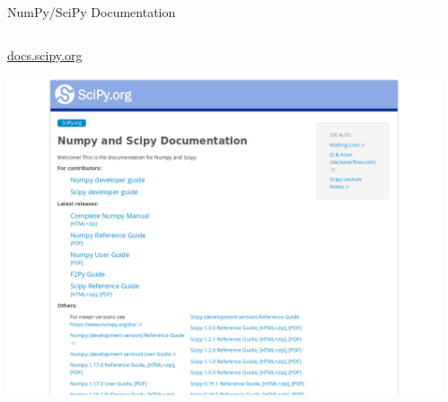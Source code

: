 \documentclass[svgnames]{beamer}
\begin{document}
\begin{frame}{NumPy/SciPy Documentation}
 \begin{columns}
  \begin{column}{0.45\textwidth}
   \url{docs.scipy.org}

   \vspace{0.5truecm}
   \hspace*{-1.0truecm}%
   \includegraphics[width=1.4\textwidth]{docs-numpy-scipy}
  \end{column}%
  \begin{column}{0.55\textwidth}
   \vspace{-0.7truecm}

\end{column}
\end{columns}
\end{frame}
\end{document}
